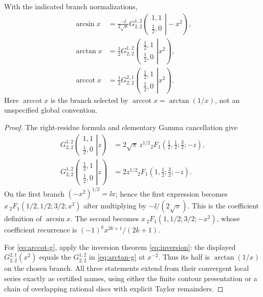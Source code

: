 \begin{theorem}\label{thm:inverse-circular}
With the indicated branch normalizations,
\begin{align}
 \arcsin x
 &=\frac{-\ii}{2\sqrt\pi}G_{2,2}^{1,2}\!\left(
   \left.\begin{matrix}1,1\\\frac12,0\end{matrix}\right|-x^2\right),
 \label{eq:arcsin-g}\\
 \arctan x
 &=\frac12G_{2,2}^{1,2}\!\left(
   \left.\begin{matrix}\frac12,1\\\frac12,0\end{matrix}\right|x^2\right),
 \label{eq:arctan-g}\\
 \operatorname{arccot}x
 &=\frac12G_{2,2}^{2,1}\!\left(
   \left.\begin{matrix}\frac12,1\\\frac12,0\end{matrix}\right|x^2\right).
 \label{eq:arccot-g}
\end{align}
Here $\operatorname{arccot}x$ is the branch selected by
$\operatorname{arccot}x=\arctan(1/x)$, not an unspecified global convention.
\end{theorem}
\begin{proof}
The right-residue formula and elementary Gamma cancellation give
\begin{align*}
G_{2,2}^{1,2}\!\left(
 \left.\begin{matrix}1,1\\\frac12,0\end{matrix}\right|z\right)
 &=2\sqrt\pi\,z^{1/2}
 {}_2F_1\!\left(\frac12,\frac12;\frac32;-z\right),\\
G_{2,2}^{1,2}\!\left(
 \left.\begin{matrix}\frac12,1\\\frac12,0\end{matrix}\right|z\right)
 &=2z^{1/2}
 {}_2F_1\!\left(1,\frac12;\frac32;-z\right).
\end{align*}
On the first branch $(-x^2)^{1/2}=\ii x$; hence the first expression becomes
$x\,{}_2F_1(1/2,1/2;3/2;x^2)$ after multiplying by
$-\ii/(2\sqrt\pi)$.  This is the coefficient definition of $\arcsin x$.
The second becomes
$x\,{}_2F_1(1,1/2;3/2;-x^2)$, whose coefficient recurrence is
$(-1)^kx^{2k+1}/(2k+1)$.

For \eqref{eq:arccot-g}, apply the inversion theorem
\eqref{eq:inversion}: the displayed $G_{2,2}^{2,1}(x^2)$ equals the
$G_{2,2}^{1,2}$ in \eqref{eq:arctan-g} at $x^{-2}$.  Thus its half is
$\arctan(1/x)$ on the chosen branch.  All three statements extend from their
convergent local series exactly as certified names, using either the finite
contour presentation or a chain of overlapping rational discs with explicit
Taylor remainders.
\end{proof}

